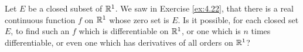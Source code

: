 \begin{myExercise}
    \label{ex:5.21}
    Let $E$ be a closed subset of ${\protect\mathbb R}^1$. 
    We saw in Exercise \ref{ex:4.22}, 
    that there is a real continuous function $f$ on ${\protect\mathbb R}^1$ whose zero set is $E$. 
    Is it possible, for each closed set $E$, to find such an $f$ which is differentiable on ${\protect\mathbb R}^1$, 
    or one which is $n$ times differentiable, 
    or even one which has derivatives of all orders on ${\protect\mathbb R}^1$?
\end{myExercise}


\begin{myExercise}
    \label{ex:5.22}
\end{myExercise}


\begin{myExercise}
    \label{ex:5.23}
\end{myExercise}



\begin{myExercise}
    \label{ex:5.24}
\end{myExercise}


\begin{myExercise}
    \label{ex:5.25}
\end{myExercise}


\begin{myExercise}
    \label{ex:5.26}
\end{myExercise}


\begin{myExercise}
    \label{ex:5.27}
\end{myExercise}


\begin{myExercise}
    \label{ex:5.28}
\end{myExercise}


\begin{myExercise}
    \label{ex:5.29}
\end{myExercise}

